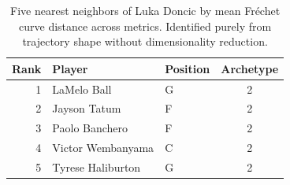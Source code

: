 \begin{table}[htbp]
  \centering\small
  \begin{tabular}{rllc}
    \toprule
    Rank & Player & Position & Archetype \\
    \midrule
    1 & LaMelo Ball & G & 2 \\
    2 & Jayson Tatum & F & 2 \\
    3 & Paolo Banchero & F & 2 \\
    4 & Victor Wembanyama & C & 2 \\
    5 & Tyrese Haliburton & G & 2 \\
    \bottomrule
  \end{tabular}
  \caption{Five nearest neighbors of Luka Doncic by mean Fr\'{e}chet curve distance across metrics. Identified purely from trajectory shape without dimensionality reduction.}
  \label{tab:Luka_Doncic_frechet_curve_neighbors}
\end{table}


